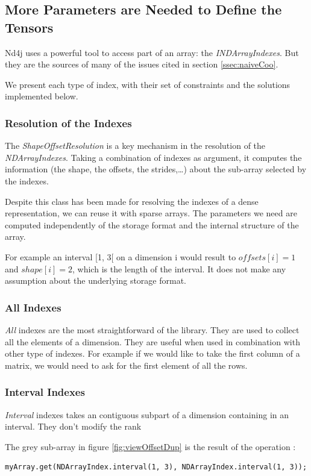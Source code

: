 \subsection{More Parameters are Needed to Define the Tensors}

Nd4j uses a powerful tool to access part of an array: the \textit{INDArrayIndexes}. But they are the sources of many of the issues cited in section \ref{ssec:naiveCoo}.

We present each type of index, with their set of constraints and the solutions implemented below.

\subsubsection{Resolution of the Indexes}

The \textit{ShapeOffsetResolution} is a key mechanism in the resolution of the \textit{NDArrayIndexes}. Taking a combination of indexes as argument, it computes the information (the shape, the offsets, the strides,\dots) about the sub-array selected by the indexes. 

Despite this class has been made for resolving the indexes of a dense representation, we can reuse it with sparse arrays. The parameters we need are computed independently of the storage format and the internal structure of the array.

For example an interval [1, 3[ on a dimension i would result to $offsets[i] = 1$ and $shape[i] = 2$, which is the length of the interval. It does not make any assumption about the underlying storage format.

\subsubsection{All Indexes}
\textit{All} indexes are the most straightforward of the library. They are used to collect all the elements of a dimension. They are useful when used in combination with other type of indexes. For example if we would like to take the first column of a matrix, we would need to ask for the first element of all the rows.

\subsubsection{Interval Indexes}
\textit{Interval} indexes takes an contiguous subpart of a dimension containing in an interval. They don't modify the rank

The grey sub-array in figure \ref{fig:viewOffsetDup} is the result of the operation :
\begin{lstlisting}[style=nonumbers]
	myArray.get(NDArrayIndex.interval(1, 3), NDArrayIndex.interval(1, 3));
\end{lstlisting} 

